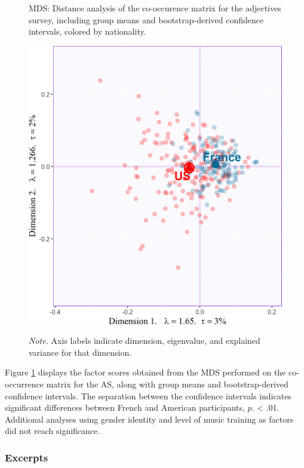 \documentclass[
  english,
  man,floatsintext]{apa6}
\begin{document}

\begin{figure}   
  \centering  
  \caption{MDS: Distance analysis of the co-occurence matrix for the adjectives survey, including group means and bootstrap-derived confidence intervals, colored by nationality.}
    \includegraphics[width=0.4\columnwidth]{./Music-Descriptor-Space_files/figure-latex/map4RVAcode-1.png}
  \label{fig:map4RVA}
  \caption*{\footnotesize \textit{Note.} Axis labels indicate dimension, eigenvalue, and explained variance for that dimension.}
\end{figure}

Figure \ref{fig:map4RVA} displays the factor scores obtained from the MDS performed on the co-occurrence matrix for the AS, along with group means and bootstrap-derived confidence intervals. The separation between the confidence intervals indicates significant differences between French and American participants, \(\textit{p}\). \textless{} .01. Additional analyses using gender identity and level of music training as factors did not reach significance.

\newpage

\hypertarget{excerpts-1}{%
\subsubsection{Excerpts}\label{excerpts-1}}
\end{document}
